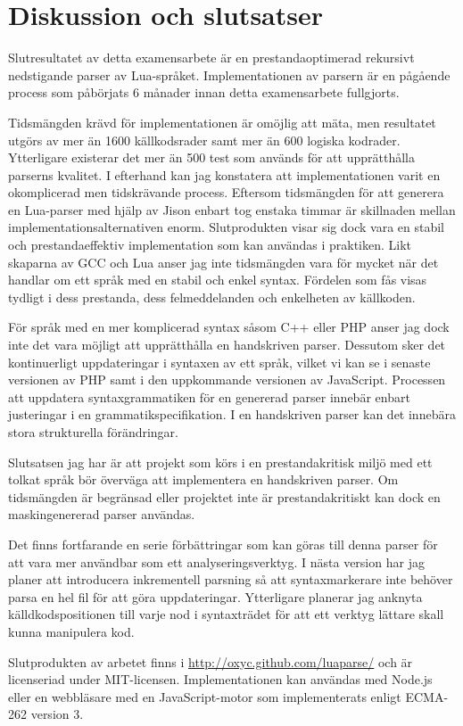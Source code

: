 \section{Diskussion och slutsatser}

Slutresultatet av detta examensarbete är en prestandaoptimerad rekursivt
nedstigande parser av Lua-språket. Implementationen av parsern är en pågående
process som påbörjats 6 månader innan detta examensarbete fullgjorts.

Tidsmängden krävd för implementationen är omöjlig att mäta, men resultatet
utgörs av mer än 1600 källkodsrader samt mer än 600 logiska kodrader.
Ytterligare existerar det mer än 500 test som används för att upprätthålla
parserns kvalitet. I efterhand kan jag konstatera att implementationen varit
en okomplicerad men tidskrävande process. Eftersom tidsmängden för att
generera en Lua-parser med hjälp av Jison enbart tog enstaka timmar är
skillnaden mellan implementationsalternativen enorm. Slutprodukten visar sig
dock vara en stabil och prestandaeffektiv implementation som kan användas i
praktiken. Likt skaparna av GCC och Lua anser jag inte tidsmängden vara för
mycket när det handlar om ett språk med en stabil och enkel syntax. Fördelen
som fås visas tydligt i dess prestanda, dess felmeddelanden och enkelheten av
källkoden.

För språk med en mer komplicerad syntax såsom C++ eller PHP anser jag dock
inte det vara möjligt att upprätthålla en handskriven parser. Dessutom sker
det kontinuerligt uppdateringar i syntaxen av ett språk, vilket vi kan se i
senaste versionen av PHP samt i den uppkommande versionen av JavaScript.
Processen att uppdatera syntaxgrammatiken för en genererad parser innebär
enbart justeringar i en grammatikspecifikation. I en handskriven parser kan
det innebära stora strukturella förändringar.

Slutsatsen jag har är att projekt som körs i en prestandakritisk miljö med ett
tolkat språk bör överväga att implementera en handskriven parser. Om
tidsmängden är begränsad eller projektet inte är prestandakritiskt kan dock en
maskingenererad parser användas.

Det finns fortfarande en serie förbättringar som kan göras till denna
parser för att vara mer användbar som ett analyseringsverktyg. I nästa version
har jag planer att introducera inkrementell parsning så att syntaxmarkerare
inte behöver parsa en hel fil för att göra uppdateringar. Ytterligare planerar
jag anknyta källdkodspositionen till varje nod i syntaxträdet för att ett
verktyg lättare skall kunna manipulera kod.

Slutprodukten av arbetet finns i \url{http://oxyc.github.com/luaparse/} och är
licenseriad under MIT-licensen. Implementationen kan användas med Node.js
eller en webbläsare med en JavaScript-motor som implementerats enligt ECMA-262
version 3.

